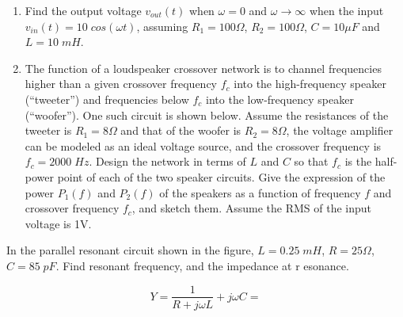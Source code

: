 \begin{enumerate}
\item Find the output voltage $v_{out}(t)$ when $\omega=0$ and 
$\omega\rightarrow \infty$ when the input $v_{in}(t)=10\;cos(\omega t)$, 
assuming $R_1=100\Omega$, $R_2=100\Omega$, $C=10\mu F$ and $L=10\;mH$.


% 

\item The function of a loudspeaker crossover network is to channel 
frequencies higher than a given crossover frequency $f_c$ into the
high-frequency speaker (``tweeter'') and frequencies below $f_c$ into
the low-frequency speaker (``woofer''). One such circuit is shown below.
Assume the resistances of the tweeter is $R_1=8\Omega$ and that of the 
woofer is $R_2=8\Omega$, the voltage amplifier can be modeled as an
ideal voltage source, and the crossover frequency is $f_c=2000\; Hz$.
Design the network in terms of $L$ and $C$ so that $f_c$ is the
half-power point of each of the two speaker circuits. Give the expression
of the power $P_1(f)$ and $P_2(f)$ of the speakers as a function of 
frequency $f$ and crossover frequency $f_c$, and sketch them. Assume the
RMS of the input voltage is 1V.


% 


\end{enumerate}


\item In the parallel resonant circuit shown in the figure, $L=0.25\;mH$,
$R=25\Omega$, $C=85\;pF$. Find resonant frequency, and the impedance at r
esonance.


\[	Y=\frac{1}{R+j\omega L}+j\omega C=	\]



